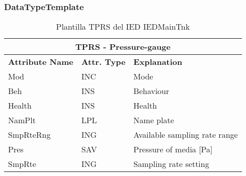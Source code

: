     \subsubsection{DataTypeTemplate}
    \begin{table}[H]
    \begin{center}
    \begin{tabular}{|l|l|p{8.5cm}|}
            \hline
            \multicolumn{3}{|c|}{\cellcolor[gray]{0.8} \textbf{ TPRS}  - Pressure-gauge} \\
            \hline
            \textbf{Attribute Name} & \textbf{Attr. Type} & \textbf{Explanation} \\
            \hline 
            Mod & INC & Mode \\
            \hline
            Beh & INS & Behaviour \\
            \hline
            Health & INS & Health \\
            \hline
            NamPlt & LPL & Name plate \\
            \hline
            SmpRteRng & ING & Available sampling rate range \\
            \hline
            Pres & SAV & Pressure of media [Pa] \\
            \hline
            SmpRte & ING & Sampling rate setting \\
            \hline
    \end{tabular}
    \caption{Plantilla TPRS del IED IEDMainTnk}
    \label{table:lnTypeTPRS_gauge}
    \end{center}
    \end{table}
    
    
    
